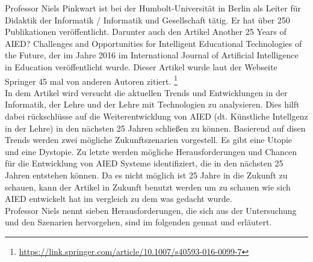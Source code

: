 
Professor Niels Pinkwart ist bei der Humbolt-Universität in Berlin als Leiter für \glqq{} Didaktik der Informatik / Informatik und Gesellschaft\grqq{} tätig. 
Er hat über 250 Publikationen veröffentlicht. Darunter auch den Artikel \glqq{} Another 25 Years of AIED? Challenges and Opportunities for Intelligent Educational Technologies of the Future\grqq{}, der im Jahre 2016 im \glqq International Journal of Artificial Intelligence in Education\grqq{} veröffentlicht wurde.
Dieser Artikel wurde laut der Webseite Springer 45 mal von anderen Autoren zitiert. \footnote{\url{https://link.springer.com/article/10.1007/s40593-016-0099-7}}
\\ \noindent
In dem Artikel wird versucht die aktuellen Trends und Entwicklungen in der Informatik, der Lehre und der Lehre mit Technologien zu analysieren. Dies hilft dabei rückschlüsse auf die Weiterentwicklung
von \ac{AIED} (dt. Künstliche Intellgenz in der Lehre) in den nächsten 25 Jahren schließen zu können. Basierend auf disen Trends werden zwei mögliche Zukunftszenarien vorgestell.
Es gibt eine Utopie und eine Dystopie. Zu letzte werden mögliche Herausforderungen und Chancen für die Entwicklung von \ac{AIED} Systeme identifiziert, die in den nächsten 25 Jahren entstehen können. 
Da es nicht möglich ist 25 Jahre in die Zukunft zu schauen, kann der Artikel in Zukunft benutzt werden um zu schauen wie sich \ac{AIED} entwickelt hat im vergleich zu dem was gedacht wurde.
\\ \noindent
Professor Niels nennt sieben Herausforderungen, die sich aus der Untersuchung und den Szenarien hervorgehen, sind im folgenden gennat und erläutert.
